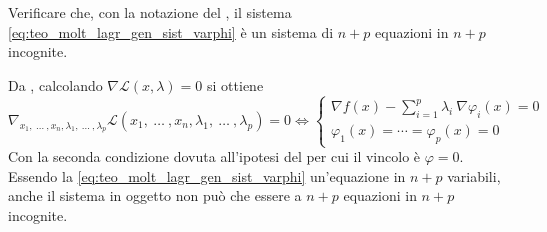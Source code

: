 \begin{exercise}
	Verificare che, con la notazione del , il sistema \cref{eq:teo_molt_lagr_gen_sist_varphi} è un sistema di $n + p$ equazioni in $n + p$ incognite.
	\begin{solution}
		Da , calcolando $\nabla \mathcal{L}(x, \lambda) = 0$ si ottiene
		\[
			\nabla_{x_1,\:\dotsc\:,x_n, \lambda_1,\:\dotsc\:,\lambda_p} \mathcal{L}(x_1,\:\dotsc\:, x_n, \lambda_1,\:\dotsc\:,\lambda_p)=0
			\iff
			\begin{cases}
				\nabla f(x) - \sum\limits_{i=1}^{p} {\lambda_i \: \nabla \varphi_i (x)} = 0\\
				\varphi_1(x) = \cdots = \varphi_p(x) = 0
			\end{cases}
		\]
		Con la seconda condizione dovuta all'ipotesi del  per cui il vincolo è $\varphi = 0$.\\
		Essendo la \cref{eq:teo_molt_lagr_gen_sist_varphi} un'equazione in $n + p$ variabili, anche il sistema in oggetto non può che essere a $n + p$ equazioni in $n + p$ incognite.
	\end{solution}
\end{exercise}
